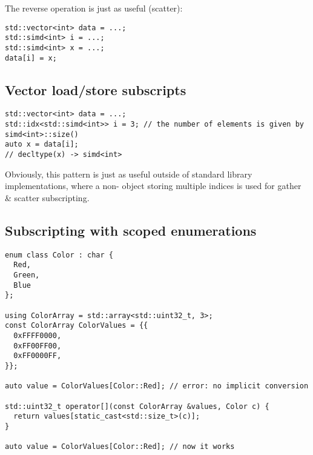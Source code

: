 The reverse operation is just as useful (scatter):
\smallskip\begin{lstlisting}
std::vector<int> data = ...;
std::simd<int> i = ...;
std::simd<int> x = ...;
data[i] = x;
\end{lstlisting}

\subsection{Vector load/store subscripts}
\begin{lstlisting}[morekeywords={[5]idx}]
std::vector<int> data = ...;
std::idx<std::simd<int>> i = 3; // the number of elements is given by simd<int>::size()
auto x = data[i];
// decltype(x) -> simd<int>
\end{lstlisting}


Obviously, this pattern is just as useful outside of standard library implementations, where a non- object storing multiple indices is used for gather \& scatter subscripting.

\subsection{Subscripting with scoped enumerations}

\begin{lstlisting}[style=Vc]
enum class Color : char {
  Red,
  Green,
  Blue
};

using ColorArray = std::array<std::uint32_t, 3>;
const ColorArray ColorValues = {{
  0xFFFF0000,
  0xFF00FF00,
  0xFF0000FF,
}};

auto value = ColorValues[Color::Red]; // error: no implicit conversion

std::uint32_t operator[](const ColorArray &values, Color c) {
  return values[static_cast<std::size_t>(c)];
}

auto value = ColorValues[Color::Red]; // now it works
\end{lstlisting}

